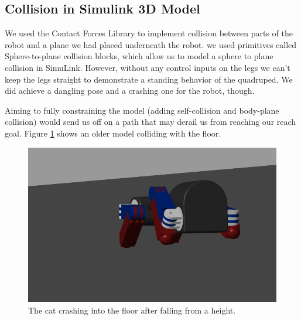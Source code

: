 \subsection{Collision in Simulink 3D Model}
We used the Contact Forces Library to implement collision between parts of the robot and a plane we had placed underneath the robot. we used primitives called Sphere-to-plane collision blocks, which allow us to model a sphere to plane collision in SimuLink. However, without any control inputs on the legs we can't keep the legs straight to demonstrate a standing behavior of the quadruped. We did achieve a dangling pose and a crashing one for the robot, though.

Aiming to fully constraining the model (adding self-collision and body-plane collision) would send us off on a path that may derail us from reaching our reach goal. Figure \ref{fig:collision} shows an older model colliding with the floor.
\begin{figure}[thpb]
    \parbox{\linewidth}{\includegraphics[width=\linewidth]{Figures/ContactModel.png}}
    \caption{The cat crashing into the floor after falling from a height.}
    \label{fig:collision}
\end{figure}

